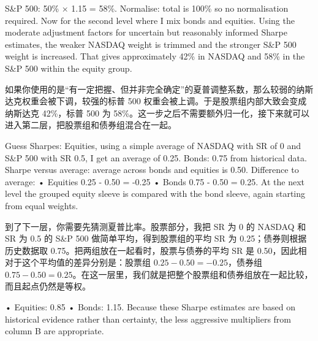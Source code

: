 
\begin{englishblock} S\&P 500: 50\% × 1.15 = 58\%. Normalise: total is 100\% so no normalisation required. Now for the second level where I mix bonds and equities. Using the moderate adjustment factors for uncertain but reasonably informed Sharpe estimates, the weaker NASDAQ weight is trimmed and the stronger S\&P 500 weight is increased. That gives approximately 42\% in NASDAQ and 58\% in the S\&P 500 within the equity group. \end{englishblock}

\begin{chineseblock}如果你使用的是“有一定把握、但并非完全确定”的夏普调整系数，那么较弱的纳斯达克权重会被下调，较强的标普 500 权重会被上调。于是股票组内部大致会变成纳斯达克 42\%，标普 500 为 58\%。这一步之后不需要额外归一化，接下来就可以进入第二层，把股票组和债券组混合在一起。\end{chineseblock}


\begin{englishblock} Guess Sharpes: Equities, using a simple average of NASDAQ with SR of 0 and S\&P 500 with SR 0.5, I get an average of 0.25. Bonds: 0.75 from historical data. Sharpe versus average: average across bonds and equities is 0.50. Difference to average: • Equities 0.25 - 0.50 = -0.25 • Bonds 0.75 - 0.50 = 0.25. At the next level the grouped equity sleeve is compared with the bond sleeve, again starting from equal weights. \end{englishblock}

\begin{chineseblock}到了下一层，你需要先猜测夏普比率。股票部分，我把 SR 为 0 的 NASDAQ 和 SR 为 0.5 的 S\&P 500 做简单平均，得到股票组的平均 SR 为 0.25；债券则根据历史数据取 0.75。把两组放在一起看时，股票与债券的平均 SR 是 0.50，因此相对于这个平均值的差异分别是：股票组 \(0.25 - 0.50 = -0.25\)，债券组 \(0.75 - 0.50 = 0.25\)。在这一层里，我们就是把整个股票组和债券组放在一起比较，而且起点仍然是等权。\end{chineseblock}


\begin{englishblock}• Equities: 0.85 • Bonds: 1.15. Because these Sharpe estimates are based on historical evidence rather than certainty, the less aggressive multipliers from column B are appropriate. \end{englishblock}


